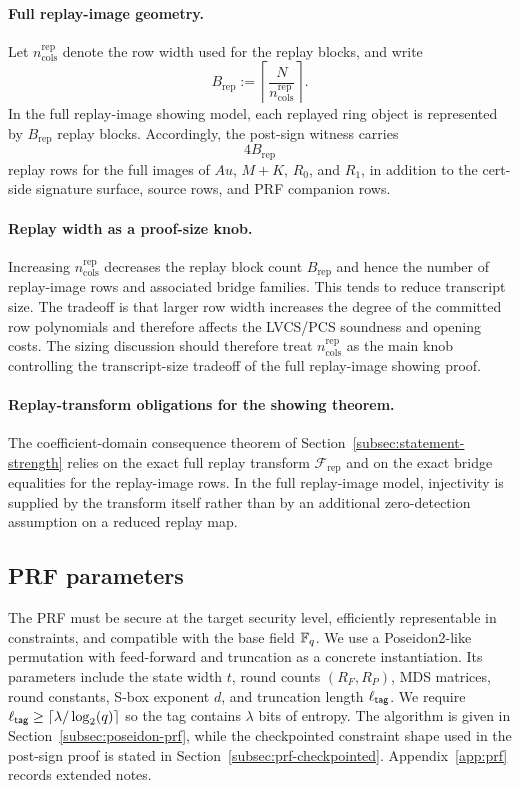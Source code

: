 \paragraph{Full replay-image geometry.}
Let \(n_{\mathrm{cols}}^{\mathrm{rep}}\) denote the row width used for the replay blocks, and write
\[
B_{\mathrm{rep}} := \left\lceil \frac{N}{n_{\mathrm{cols}}^{\mathrm{rep}}} \right\rceil .
\]
In the full replay-image showing model, each replayed ring object is represented by \(B_{\mathrm{rep}}\) replay blocks.
Accordingly, the post-sign witness carries
\[
4B_{\mathrm{rep}}
\]
replay rows for the full images of \(Au\), \(M+K\), \(R_0\), and \(R_1\), in addition to the cert-side signature
surface, source rows, and PRF companion rows.

\paragraph{Replay width as a proof-size knob.}
Increasing \(n_{\mathrm{cols}}^{\mathrm{rep}}\) decreases the replay block count \(B_{\mathrm{rep}}\) and hence the number
of replay-image rows and associated bridge families. This tends to reduce transcript size. The tradeoff is that larger
row width increases the degree of the committed row polynomials and therefore affects the LVCS/PCS soundness and opening
costs. The sizing discussion should therefore treat \(n_{\mathrm{cols}}^{\mathrm{rep}}\) as the main knob controlling the
transcript-size tradeoff of the full replay-image showing proof.

\paragraph{Replay-transform obligations for the showing theorem.}
The coefficient-domain consequence theorem of Section~\ref{subsec:statement-strength} relies on the exact full replay
transform \(\mathcal F_{\mathrm{rep}}\) and on the exact bridge equalities for the replay-image rows. In the full
replay-image model, injectivity is supplied by the transform itself rather than by an additional zero-detection
assumption on a reduced replay map.

\subsection{PRF parameters}
The PRF must be secure at the target security level, efficiently representable in constraints, and compatible with the
base field \(\mathbb{F}_q\). We use a Poseidon2-like permutation with feed-forward and truncation as a concrete instantiation.
Its parameters include the state width \(t\), round counts \((R_F,R_P)\), MDS matrices, round constants, S-box exponent
\(d\), and truncation length \(\ell_{\mathsf{tag}}\). We require
\(\ell_{\mathsf{tag}}\ge \lceil \lambda/\log_2(q)\rceil\) so the tag contains \(\lambda\) bits of entropy. The algorithm is
given in Section~\ref{subsec:poseidon-prf}, while the checkpointed constraint shape used in the post-sign proof is
stated in Section~\ref{subsec:prf-checkpointed}. Appendix~\ref{app:prf} records extended notes.

